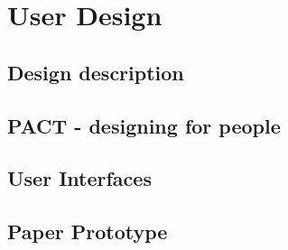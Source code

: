 \chapter{User Design}


\section{Design description}



\section{PACT - designing for people}


\section{User Interfaces}


\section{Paper Prototype}

